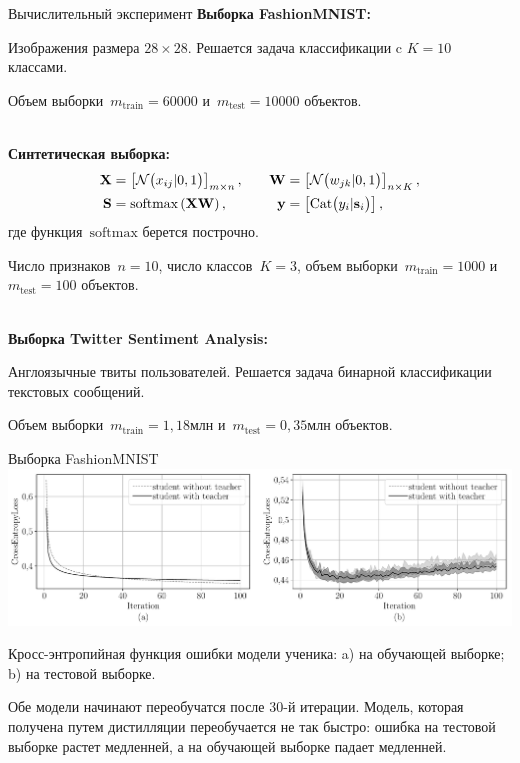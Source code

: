 \documentclass[10pt,pdf,hyperref={unicode}]{beamer}
\begin{document}
\begin{frame}{Вычислительный эксперимент}
\justifying
\textbf{Выборка FashionMNIST:}

Изображения размера $28\times 28$. Решается задача классификации c $K=10$ классами.

Объем выборки~$m_{\text{train}}=60000$ и~$m_{\text{test}}=10000$ объектов.

~\\
\textbf{Синтетическая выборка:}
\[
\setlength\abovedisplayskip{0pt}
\begin{aligned}
\mathbf{X} &= \left[\mathcal{N}\bigr(x_{ij}|0, 1\bigr)\right]_{m\times n},  \quad &\mathbf{W} &= \left[\mathcal{N}\bigr(w_{jk}|0, 1\bigr)\right]_{n\times K}, \\
 \mathbf{S} &= \text{softmax}\left(\mathbf{XW}\right), \quad &\mathbf{y} &= \left[\text{Cat}\bigr(y_i| \mathbf{s}_i\bigr)\right],
\end{aligned}
\setlength\belowdisplayskip{0pt}
\]
где функция~$\text{softmax}$ берется построчно.

Число признаков~$n=10$, число классов~$K=3$, объем выборки~$m_{\text{train}}=1000$ и~$m_{\text{test}}=100$ объектов. 

~\\
\textbf{Выборка Twitter Sentiment Analysis:}

Англоязычные твиты пользователей. Решается задача бинарной классификации текстовых сообщений.

Объем выборки~$m_{\text{train}}=1{,}18$млн и~$m_{\text{test}}=0{,}35$млн объектов.

\end{frame}

\begin{frame}{Выборка FashionMNIST}
\justifying
{\center
\includegraphics[width=1\textwidth]{figures/mnist_loss}
}

Кросс-энтропийная функция ошибки модели ученика: a) на обучающей выборке; b) на тестовой выборке.

Обе модели начинают переобучатся после 30-й итерации. Модель, которая получена путем дистилляции переобучается не так быстро: ошибка на тестовой выборке растет медленней, а на обучающей выборке падает медленней.



\end{frame}
\end{document}
